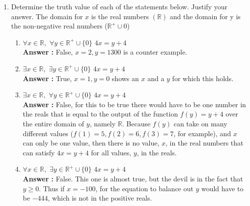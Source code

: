 \documentclass[a4paper,11pt]{article}
\newcommand{\answer}{\textbf{Answer : }}
\begin{document}
\begin{enumerate}
\item Determine the truth value of each of the statements below. Justify your answer. The domain
for $x$ is the real numbers $(\mathbb{R})$ and the domain for y is the non-negative real numbers ($\mathbb{R}^+ \cup {0}$)

   \begin{enumerate}
     \item $\forall x \in \mathbb{R},$ $\forall y \in \mathbb{R}^+ \cup \{0\}$ \qquad $ 4x = y+4$ \\
     \answer False, $x = 2, y = 1300$ is a counter example.

     \item $\exists x \in \mathbb{R},$ $\exists y \in \mathbb{R}^+ \cup \{0\}$ \qquad $ 4x = y+4$ \\
     \answer True, $x = 1, y = 0$ shows an $x$ and a $y$ for which this holds. 

     \item $\exists x \in \mathbb{R},$ $\forall y \in \mathbb{R}^+ \cup \{0\}$ \qquad $ 4x = y+4$ \\
     \answer False, for this to be true there would have to be one number in the reals that is equal to the output of the function $f(y) = y+4$ over the entire domain of $y$, namely $\mathbb{R}$. Because $f(y)$ can take on many different values ($f(1) = 5, f(2) = 6, f(3) = 7$, for example), and $x$ can only be one value, then there is no value, $x$, in the real numbers that can satisfy $ 4x = y+4$ for all values, $y$, in the reals.

     \item $\forall x \in \mathbb{R},$ $\exists y \in \mathbb{R}^+ \cup \{0\}$ \qquad $ 4x = y+4$ \\
     \answer False. This one is almost true, but the devil is in the fact that $y \geq 0$. Thus if $x = -100$, for the equation to balance out $y$ would have to be $-444$, which is not in the positive reals. 


\end{enumerate}
\end{enumerate}
\end{document}
